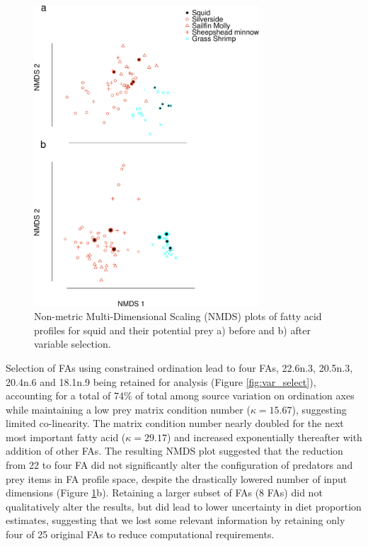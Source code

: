 \documentclass[fleqn,10pt]{wlpeerj}
\begin{document}
\begin{figure}
  \begin{center}
      \includegraphics[width=0.75\textwidth]{figures/2nd_NMDS_pre.pdf}
    \caption{Non-metric Multi-Dimensional Scaling (NMDS) plots of fatty acid profiles
      for 
      squid and their potential prey a) before and b) after variable selection.}
    \label{fig:squid_FAP}
  \end{center}
\end{figure}

Selection of FAs using constrained ordination
lead to four FAs, 22.6n.3, 20.5n.3, 20.4n.6 and 18.1n.9 being
retained for analysis (Figure \ref{fig:var_select}), accounting for a
total of 74\% of total among source variation on ordination axes
while maintaining a low prey matrix condition number ($\kappa=15.67$),
suggesting limited co-linearity. The matrix condition number nearly
doubled for the next most important fatty acid ($\kappa=29.17$) and
increased exponentially thereafter with addition of other FAs. The
resulting NMDS plot suggested that the reduction from 22 to four FA did
not significantly alter the configuration of predators and prey items
in FA profile space, despite the drastically lowered number of input
dimensions (Figure \ref{fig:squid_FAP}b). Retaining a larger subset of
FAs (8 FAs) did not qualitatively alter the results, but did lead to lower
uncertainty in diet proportion estimates, suggesting that we lost some
relevant information by retaining only four of 25 original FAs to
reduce computational requirements.
\end{document}
